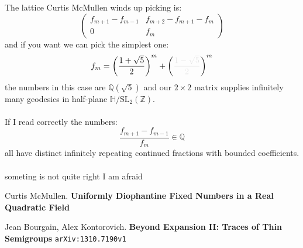 \documentclass[12pt]{article}
\begin{document}
\newpage

\noindent The lattice Curtis McMullen winds up picking is:
$$ \left(
\begin{array}{c|c}
f_{m+1}- f_{m-1} & f_{m+2} - f_{m+1} - f_m \\ \hline
0 & f_m
\end{array}
\right) $$
and if you want we can pick the simplest one:
$$ f_m = \left( 
\frac{1+\sqrt{5}}{2}
\right)^m
+ \left( {\color{black!10!white}{
\frac{1-\sqrt{5}}{2}}}
\right)^m$$
the numbers in this case are $\mathbb{Q}(\sqrt{5})$ and our $2 \times 2$ matrix supplies infinitely many geodesics in half-plane $\mathbb{H}/\mathrm{SL}_2(\mathbb{Z})$.  \\ \\
If I read correctly the numbers:
$$ \frac{f_{m+1} - f_{m-1}}{f_m} \in \mathbb{Q}$$
all have distinct infinitely repeating continued fractions with bounded coefficients. \\ \\ someting is not quite right I am afraid

\newpage

\selectfont \fontsize{12}{10}\selectfont

\begin{thebibliography}{}

\item Curtis McMullen.  \textbf{Uniformly Diophantine Fixed Numbers in a Real Quadratic Field}

\item Jean Bourgain, Alex Kontorovich.
\textbf{Beyond Expansion II: Traces of Thin Semigroups} \texttt{arXiv:1310.7190v1}

\end{thebibliography}
\end{document}
